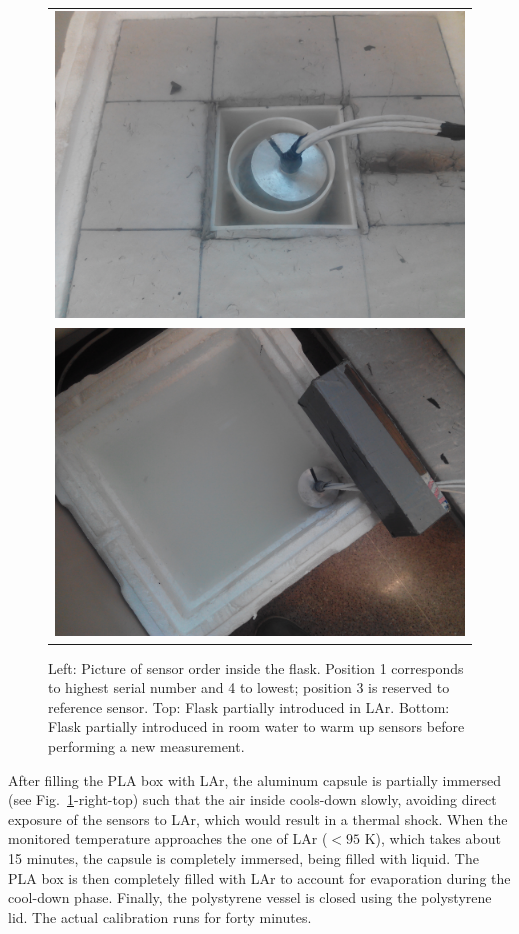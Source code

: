 \begin{figure}[htbp]
\begin{tabular}{ c } 
\includegraphics[height=0.1665\textheight]{images/figure_8_b.jpg} \\
\includegraphics[height=0.1665\textheight]{images/figure_8_c.jpg} 
\end{tabular}
\caption{Left: Picture of sensor order inside the flask. Position 1 corresponds to highest serial number and 4 to lowest; position 3 is reserved to reference sensor.
 Top: Flask partially introduced in LAr.
 Bottom: Flask partially introduced in room water to warm up sensors before performing a new measurement.
\label{fi:CAL_procedure}}
\end{figure}

After filling the PLA box with LAr, the aluminum capsule is partially immersed (see Fig.~\ref{fi:CAL_procedure}-right-top) such that the air inside cools-down slowly, avoiding direct exposure of the sensors to LAr, which would result in a thermal shock. When the monitored temperature approaches the one of LAr ($< 95$ K), which takes about 15 minutes, the capsule is completely immersed, being filled with liquid. The PLA box is then completely filled with LAr to account for evaporation during the cool-down phase. Finally, the polystyrene vessel is closed using the polystyrene lid. The actual calibration runs for forty minutes. 

